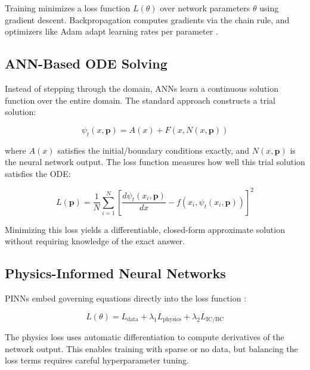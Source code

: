 Training minimizes a loss function $L(\theta)$ over network parameters $\theta$ using gradient descent. Backpropagation computes gradients via the chain rule, and optimizers like Adam adapt learning rates per parameter \cite{dubey2024solving, audu2026neural}.

\subsection{ANN-Based ODE Solving}

Instead of stepping through the domain, ANNs learn a continuous solution function over the entire domain. The standard approach \cite{lagaris1998ann, mall2013comparison, okereke2021novel} constructs a trial solution:

\begin{equation}
\psi_t(x, \mathbf{p}) = A(x) + F(x, N(x, \mathbf{p}))
\label{eq:trial_solution}
\end{equation}

where $A(x)$ satisfies the initial/boundary conditions exactly, and $N(x, \mathbf{p})$ is the neural network output. The loss function measures how well this trial solution satisfies the ODE:

\begin{equation}
L(\mathbf{p}) = \frac{1}{N} \sum_{i=1}^{N} \left[ \frac{d\psi_t(x_i, \mathbf{p})}{dx} - f(x_i, \psi_t(x_i, \mathbf{p})) \right]^2
\label{eq:ode_loss}
\end{equation}

Minimizing this loss yields a differentiable, closed-form approximate solution without requiring knowledge of the exact answer.

\subsection{Physics-Informed Neural Networks}

PINNs embed governing equations directly into the loss function \cite{raissi2019pinn, matthews2024pinnde, babni2025error, audu2026neural}:

\begin{equation}
L(\theta) = L_{\text{data}} + \lambda_1 L_{\text{physics}} + \lambda_2 L_{\text{IC/BC}}
\end{equation}

The physics loss uses automatic differentiation to compute derivatives of the network output. This enables training with sparse or no data, but balancing the loss terms requires careful hyperparameter tuning.

